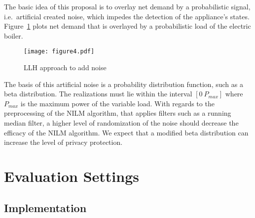 \documentclass{article}
\begin{document}
The basic idea of this proposal is to overlay net demand by a probabilistic signal, i.e.\ artificial created noise, which impedes the detection of the appliance’s states. Figure~\ref{llh_method} plots net demand that is overlayed by a probabilistic load of the electric boiler.
\begin{figure}[h!]
	\centering
	\texttt{[image: figure4.pdf]}
	\caption{\ac{LLH} approach to add noise}
	\label{llh_method}
\end{figure}
The basis of this artificial noise is a probability distribution function, such as a beta distribution. The realizations must lie within the interval $[0 \: P_{max}]$ where $P_{max}$ is the maximum power of the variable load. 
With regards to the preprocessing of the \ac{NILM} algorithm, that applies filters such as a running median filter, a higher level of randomization of the noise should decrease the efficacy of the \ac{NILM} algorithm. We expect that a modified beta distribution can increase the level of privacy protection. 

\section{Evaluation Settings}\label{sec:settings}
\subsection{Implementation}
\end{document}
